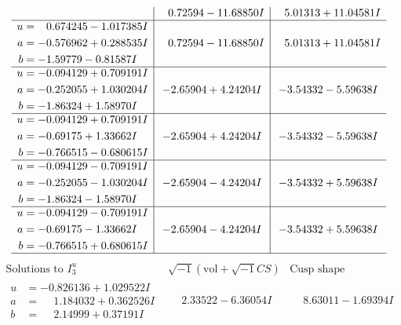 \documentclass[1p]{elsarticle_modified}
\theoremstyle{definition}
\newcommand{\I}{\sqrt{-1}}
\begin{document}
$$\begin{array}{c|c|c}
 & \phantom{-}0.72594 - 11.68850 I & \phantom{-}5.01313 + 11.04581 I \\ \hline\begin{aligned}
u &= \phantom{-}0.674245 - 1.017385 I \\
a &= -0.576962 + 0.288535 I \\
b &= -1.59779 - 0.81587 I\end{aligned}
 & \phantom{-}0.72594 - 11.68850 I & \phantom{-}5.01313 + 11.04581 I \\ \hline\begin{aligned}
u &= -0.094129 + 0.709191 I \\
a &= -0.252055 + 1.030204 I \\
b &= -1.86324 + 1.58970 I\end{aligned}
 & -2.65904 + 4.24204 I & -3.54332 - 5.59638 I \\ \hline\begin{aligned}
u &= -0.094129 + 0.709191 I \\
a &= -0.69175 + 1.33662 I \\
b &= -0.766515 - 0.680615 I\end{aligned}
 & -2.65904 + 4.24204 I & -3.54332 - 5.59638 I \\ \hline\begin{aligned}
u &= -0.094129 - 0.709191 I \\
a &= -0.252055 - 1.030204 I \\
b &= -1.86324 - 1.58970 I\end{aligned}
 & -2.65904 - 4.24204 I & -3.54332 + 5.59638 I \\ \hline\begin{aligned}
u &= -0.094129 - 0.709191 I \\
a &= -0.69175 - 1.33662 I \\
b &= -0.766515 + 0.680615 I\end{aligned}
 & -2.65904 - 4.24204 I & -3.54332 + 5.59638 I\\
 \hline 
 \end{array}$$\newpage$$\begin{array}{c|c|c}  
\text{Solutions to }I^u_{3}& \I (\text{vol} + \sqrt{-1}CS) & \text{Cusp shape}\\
 \hline 
\begin{aligned}
u &= -0.826136 + 1.029522 I \\
a &= \phantom{-}1.184032 + 0.362526 I \\
b &= \phantom{-}2.14999 + 0.37191 I\end{aligned}
 & \phantom{-}2.33522 - 6.36054 I & \phantom{-}8.63011 - 1.69394 I \\ \hline\begin{aligned}

\end{aligned}
\end{array}$$
\end{document}
